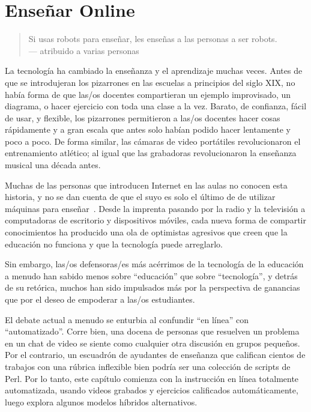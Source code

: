 \chapter{Enseñar Online}\label{s:online}

\begin{quote}

 Si usas robots para enseñar, les enseñas a las personas a ser robots. \\
  --- atribuido a varias personas

\end{quote}

La tecnología ha cambiado la enseñanza y el aprendizaje muchas veces.
Antes de que se introdujeran los pizarrones en las escuelas a principios del siglo XIX,
no había forma de que las/os docentes compartieran un ejemplo improvisado,
un diagrama,
o hacer ejercicio con toda una clase a la vez.
Barato,
de confianza,
fácil de usar,
y flexible,
los pizarrones permitieron a las/os docentes hacer cosas rápidamente y a gran escala
que antes solo habían podido hacer lentamente y poco a poco.
De forma similar,
las cámaras de video portátiles revolucionaron el entrenamiento atlético;
al igual que las grabadoras revolucionaron la enseñanza musical una década antes.

Muchas de las personas que introducen Internet en las aulas no conocen esta historia,
y no se dan cuenta de que el suyo es solo el último de  
de utilizar máquinas para enseñar~\cite{Watt2014}.
Desde la imprenta pasando por la radio y la televisión
a computadoras de escritorio y dispositivos móviles,
cada nueva forma de compartir conocimientos ha producido una ola de optimistas agresivos
que creen que la educación no funciona y que la tecnología puede arreglarlo.

Sin embargo,
las/os defensoras/es más acérrimos de la tecnología de la educación a menudo han sabido menos sobre ``educación'' que sobre ``tecnología'',
y detrás de su retórica,
muchos han sido impulsados más por la perspectiva de ganancias
que por el deseo de empoderar a las/os estudiantes.

El debate actual a menudo se enturbia al confundir ``en línea'' con ``automatizado''.
Corre bien,
una docena de personas que resuelven un problema en un chat de video
se siente como cualquier otra discusión en grupos pequeños.
Por el contrario,
un escuadrón de ayudantes de enseñanza que califican cientos de trabajos con una rúbrica inflexible
bien podría ser una colección de scripts de Perl.
Por lo tanto, este capítulo comienza con la instrucción en línea totalmente automatizada,
usando videos grabados y ejercicios calificados automáticamente,
luego explora algunos modelos híbridos alternativos.

